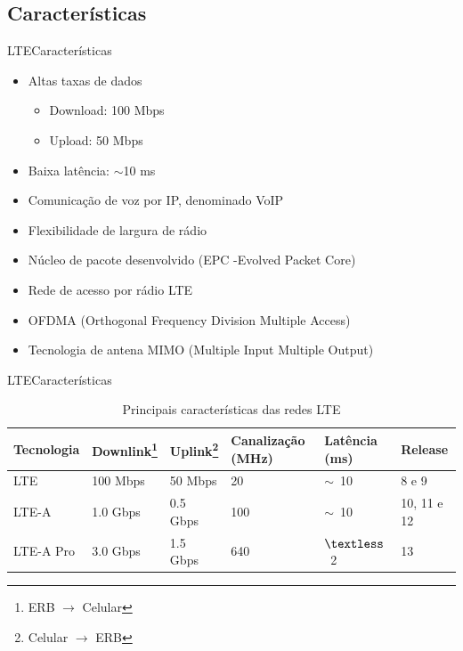 \documentclass[10pt,aspectratio=169]{beamer} %
\begin{document}
\subsection{Características}
\begin{frame}{LTE}{Características}
    \begin{itemize}
        \item Altas taxas de dados
        \begin{itemize}
            \item Download: 100 Mbps
            \item Upload: 50 Mbps
        \end{itemize}
        \item Baixa latência: $\sim$10 ms
        \item Comunicação de voz por IP, denominado VoIP
        \item Flexibilidade de largura de rádio
        \item Núcleo de pacote desenvolvido (EPC -Evolved Packet Core) \cite{epc3gpp}
        \item Rede de acesso por rádio LTE
        \item OFDMA (Orthogonal Frequency Division Multiple Access)
        \item Tecnologia de antena MIMO (Multiple Input Multiple Output)
    \end{itemize}
\end{frame}

\begin{frame}{LTE}{Características}
\begin{table}[]
\begin{tabular}{l|l|l|l|l|l}
Tecnologia      & Downlink\footnote{ERB $\rightarrow$ Celular} & Uplink\footnote{Celular $\rightarrow$ ERB}   & Canalização (MHz) & Latência (ms) & Release     \\ \hline
LTE             & 100 Mbps & 50 Mbps  & 20                & $\sim$~10      & 8 e 9       \\ \hline
LTE-A           & 1.0 Gbps & 0.5 Gbps & 100               & $\sim$~10      & 10, 11 e 12 \\ \hline
LTE-A Pro       & 3.0 Gbps & 1.5 Gbps & 640               & $\textless$~2   & 13         \\
\end{tabular}
\caption{Principais características das redes LTE}
\end{table}

\end{frame}
\end{document}
